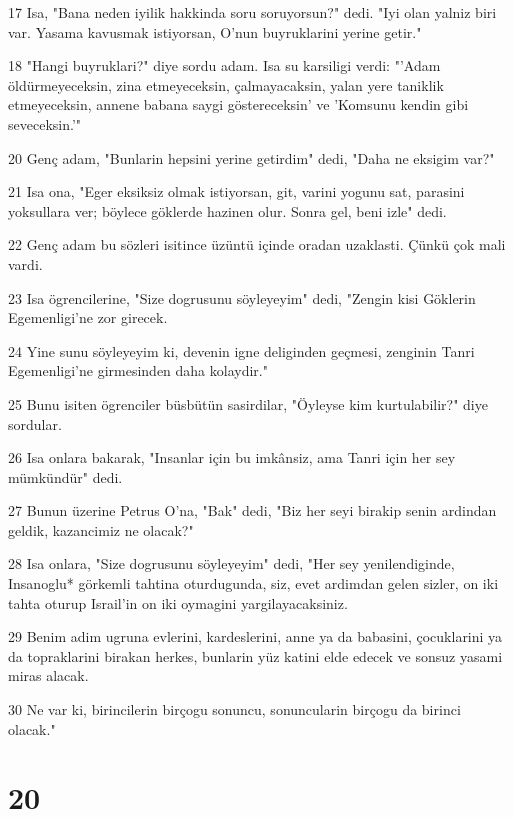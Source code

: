\par 17 Isa, "Bana neden iyilik hakkinda soru soruyorsun?" dedi. "Iyi olan yalniz biri var. Yasama kavusmak istiyorsan, O'nun buyruklarini yerine getir."
\par 18 "Hangi buyruklari?" diye sordu adam. Isa su karsiligi verdi: "'Adam öldürmeyeceksin, zina etmeyeceksin, çalmayacaksin, yalan yere taniklik etmeyeceksin, annene babana saygi göstereceksin' ve 'Komsunu kendin gibi seveceksin.'"
\par 20 Genç adam, "Bunlarin hepsini yerine getirdim" dedi, "Daha ne eksigim var?"
\par 21 Isa ona, "Eger eksiksiz olmak istiyorsan, git, varini yogunu sat, parasini yoksullara ver; böylece göklerde hazinen olur. Sonra gel, beni izle" dedi.
\par 22 Genç adam bu sözleri isitince üzüntü içinde oradan uzaklasti. Çünkü çok mali vardi.
\par 23 Isa ögrencilerine, "Size dogrusunu söyleyeyim" dedi, "Zengin kisi Göklerin Egemenligi'ne zor girecek.
\par 24 Yine sunu söyleyeyim ki, devenin igne deliginden geçmesi, zenginin Tanri Egemenligi'ne girmesinden daha kolaydir."
\par 25 Bunu isiten ögrenciler büsbütün sasirdilar, "Öyleyse kim kurtulabilir?" diye sordular.
\par 26 Isa onlara bakarak, "Insanlar için bu imkânsiz, ama Tanri için her sey mümkündür" dedi.
\par 27 Bunun üzerine Petrus O'na, "Bak" dedi, "Biz her seyi birakip senin ardindan geldik, kazancimiz ne olacak?"
\par 28 Isa onlara, "Size dogrusunu söyleyeyim" dedi, "Her sey yenilendiginde, Insanoglu* görkemli tahtina oturdugunda, siz, evet ardimdan gelen sizler, on iki tahta oturup Israil'in on iki oymagini yargilayacaksiniz.
\par 29 Benim adim ugruna evlerini, kardeslerini, anne ya da babasini, çocuklarini ya da topraklarini birakan herkes, bunlarin yüz katini elde edecek ve sonsuz yasami miras alacak.
\par 30 Ne var ki, birincilerin birçogu sonuncu, sonuncularin birçogu da birinci olacak."

\chapter{20}


